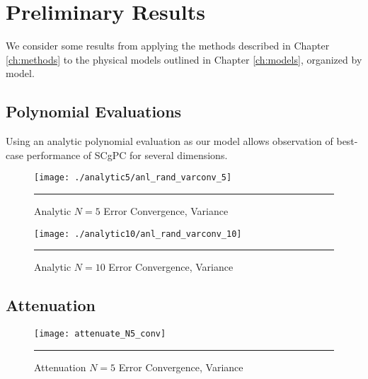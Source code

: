 
\chapter{Preliminary Results} %

\label{ch:results} %


We consider some results from applying the methods described in Chapter \ref{ch:methods} to the physical
models outlined in Chapter \ref{ch:models}, organized by model.

\section{Polynomial Evaluations}
Using an analytic polynomial evaluation as our model allows observation of best-case performance of SCgPC for
several dimensions.

\begin{figure}[H]
  \centering
    \texttt{[image: ./analytic5/anl\_rand\_varconv\_5]}
    \rule{35em}{0.5pt}
  \caption{Analytic $N=5$ Error Convergence, Variance}
  \label{fig:anl5_varconv}
\end{figure}
\begin{figure}[H]
  \centering
    \texttt{[image: ./analytic10/anl\_rand\_varconv\_10]}
    \rule{35em}{0.5pt}
  \caption{Analytic $N=10$ Error Convergence, Variance}
  \label{fig:anl10_varconv}
\end{figure}



\section{Attenuation}

\begin{figure}[H]
  \centering
    \texttt{[image: attenuate\_N5\_conv]}
    \rule{35em}{0.5pt}
  \caption{Attenuation $N=5$ Error Convergence, Variance}
  \label{fig:att5_varconv}
\end{figure}




